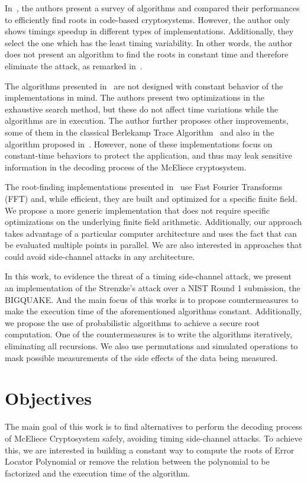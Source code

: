In~\cite{strenzke2012fast}, the authors present a survey of algorithms and compared their performances to efficiently find roots in code-based cryptosystems. However, the author only shows timings speedup in different types of implementations. Additionally, they select the one which has the least timing variability. In other words, the author does not present an algorithm to find the roots in constant time and therefore eliminate the attack, as remarked in~\cite{strenzke2013efficiency}.

The algorithms presented in~\cite{strenzke2012fast} are not designed with constant behavior of the implementations in mind. The authors present two optimizations in the exhaustive search method, but these do not affect time variations while the algorithms are in execution. The author further proposes other improvements, some of them in the classical Berlekamp Trace Algorithm~\cite{berlekamp1970factoring} and also in the algorithm proposed in~\cite{fedorenko2002finding}. However, none of these implementations focus on constant-time behaviors to protect the application, and thus may leak sensitive information in the decoding process of the McEliece cryptosystem.

The root-finding implementations presented in~\cite{chou2017mcbits, bernstein2013mcbits} use Fast Fourier Transforms (FFT) and, while efficient, they are built and optimized for a specific finite field. We propose a more generic implementation that does not require specific optimizations on the underlying finite field arithmetic. Additionally, our approach takes advantage of a particular computer architecture and uses the fact that can be evaluated multiple points in parallel. We are also interested in approaches that could avoid side-channel attacks in any architecture. 

In this work, to evidence the threat of a timing side-channel attack, we present an implementation of the Strenzke's attack over a NIST Round 1 submission, the BIGQUAKE. And the main focus of this works is to propose countermeasures to make the execution time of the aforementioned algorithms constant. Additionally, we propose the use of probabilistic algorithms to achieve a secure root computation. One of the countermeasures is to write the algorithms iteratively, eliminating all recursions. We also use permutations and simulated operations to mask possible measurements of the side effects of the data being measured.

\section{Objectives}
The main goal of this work is to find alternatives to perform the decoding process of McEliece Cryptosystem safely, avoiding timing side-channel attacks. To achieve this, we are interested in building a constant way to compute the roots of Error Locator Polynomial or remove the relation between the polynomial to be factorized and the execution time of the algorithm.



